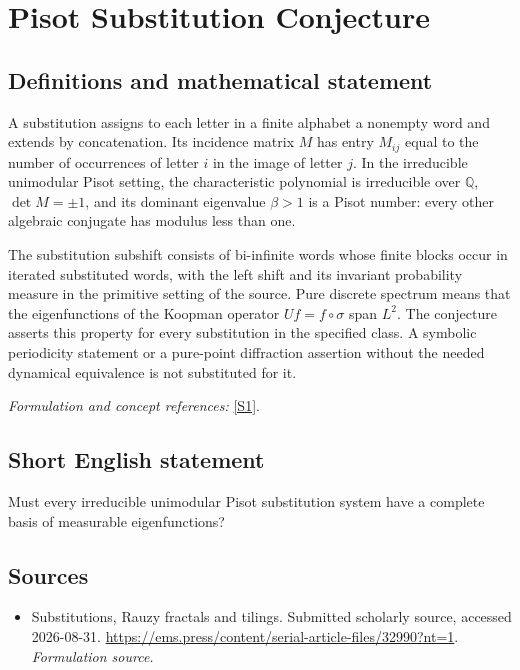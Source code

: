 \documentclass[11pt]{article}
\begin{document}
\section*{\texorpdfstring{Pisot Substitution Conjecture}{Pisot Substitution Conjecture}}\label{462}
\subsection{Definitions and mathematical statement}
A substitution assigns to each letter in a finite alphabet a nonempty word and extends by concatenation. Its incidence matrix $M$ has entry $M_{ij}$ equal to the number of occurrences of letter $i$ in the image of letter $j$. In the irreducible unimodular Pisot setting, the characteristic polynomial is irreducible over ${\mathbb{Q}}$, $\det M=\pm1$, and its dominant eigenvalue $\beta>1$ is a Pisot number: every other algebraic conjugate has modulus less than one.

The substitution subshift consists of bi-infinite words whose finite blocks occur in iterated substituted words, with the left shift and its invariant probability measure in the primitive setting of the source. Pure discrete spectrum means that the eigenfunctions of the Koopman operator $Uf=f\circ\sigma$ span $L^2$. The conjecture asserts this property for every substitution in the specified class. A symbolic periodicity statement or a pure-point diffraction assertion without the needed dynamical equivalence is not substituted for it.
\par\smallskip\textit{Formulation and concept references:} \href{https://ems.press/content/serial-article-files/32990?nt=1}{[S1]}.

\subsection{Short English statement}
Must every irreducible unimodular Pisot substitution system have a complete basis of measurable eigenfunctions?
\subsection{Sources}
\begin{itemize}
\item[S1]Substitutions, Rauzy fractals and tilings. Submitted scholarly source, accessed 2026-08-31.
\url{https://ems.press/content/serial-article-files/32990?nt=1}.
\textit{Formulation source.}
\end{itemize}
\end{document}
